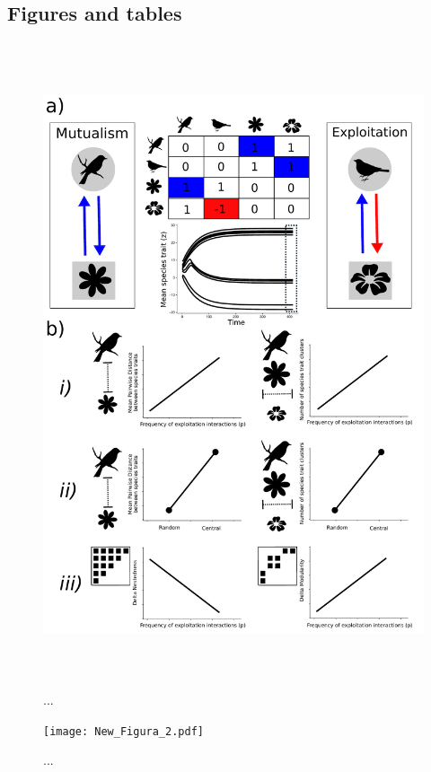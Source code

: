 \documentclass[a4paper, 12pt]{article}
\begin{document}
\subsection*{Figures and tables}
\newpage
\begin{singlespace}
\begin{figure}[H]
  \includegraphics[width = \linewidth, height = 19cm]{New_Figura_1.pdf}
  \vspace*{-7mm}
  \caption{...}
  \label{fig:1}
\end{figure}

\begin{figure}[H]
  \texttt{[image: New\_Figura\_2.pdf]}
  \vspace*{-7mm}
  \caption{...}
  \label{fig:2}
\end{figure}


\end{singlespace}
\end{document}
